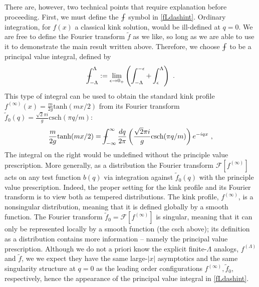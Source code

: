 \def\letter{0}\def\pr{0}\documentclass[a4paper,12pt, epsfig]{article}
\def\Xint#1{\mathchoice
   {\XXint\displaystyle\textstyle{#1}}%
   {\XXint\textstyle\scriptstyle{#1}}%
   {\XXint\scriptstyle\scriptscriptstyle{#1}}%
   {\XXint\scriptscriptstyle\scriptscriptstyle{#1}}%
   \!\int}
\def\XXint#1#2#3{{\setbox0=\hbox{$#1{#2#3}{\int}$}
     \vcenter{\hbox{$#2#3$}}\kern-.5\wd0}}
\def\dashint{\Xint-}
\renewcommand{\tanh}{\textrm{tanh}}
\newcommand{\csch}{\textrm{csch}}
\renewcommand{\(}{\begin{equation}}
\renewcommand{\)}{end{equation} \vspace{-.05in}\linebreak}
\renewcommand{\=}{\hspace{-.03in}=\hspace{-.02in}}
\renewcommand{\(}{\begin{equation}}
\renewcommand{\)}{\end{equation}}
\renewcommand{\(}{\begin{equation}}
\renewcommand{\)}{\end{equation}}
\begin{document}
There are, however, two technical points that require explanation before proceeding.  First, we must define the $\dashint$ symbol in \eqref{fLdashint}.  Ordinary integration, for $f(x)$ a classical kink solution, would be ill-defined at $q=0$.  We are free to define the Fourier transform $\tilde{f}$ as we like, so long as we are able to use it to demonstrate the main result written above.  Therefore, we choose $\dashint$ to be a principal value integral, defined by 
%
\begin{equation}\label{PVint}
\dashint_{-\Lambda}^{\Lambda} := \lim_{\epsilon \to 0_+} \left( \int_{-\Lambda}^{-\epsilon} + \int_{\epsilon}^{\Lambda} \right)~.
\end{equation}
%
This type of integral can be used to obtain the standard kink profile $f^{(\infty)}(x) = \frac{m}{2g} \tanh(mx/2)$ from its Fourier transform $\tilde{f}_0(q) = \frac{\sqrt{2} \pi i}{g} \csch(\pi q/m)$:
%
\begin{equation}\label{tildef0}
\frac{m}{2g} \tanh(mx/2) = \dashint_{-\infty}^{\infty} \frac{dq}{2\pi} \left( \frac{\sqrt{2} \pi i}{g} \csch(\pi q/m) \right) e^{-i q x}~,
\end{equation}
%
The integral on the right would be undefined without the principle value prescription.  More generally, as a distribution the Fourier transform $\mathcal{F}[f^{(\infty)}]$ acts on any test function $b(q)$ via integration against $\tilde{f}_0(q)$ with the principle value prescription.  Indeed, the proper setting for the kink profile and its Fourier transform is to view both as tempered distributions.  The kink profile, $f^{(\infty)}$, is a nonsingular distribution, meaning that it is defined globally by a smooth function.  The Fourier transform $\tilde{f}_0 = \mathcal{F}[f^{(\infty)}]$ is singular, meaning that it can only be represented locally by a smooth function (the csch above); its definition as a distribution contains more information -- namely the principal value prescription.  Although we do not a priori know the explicit finite-$\Lambda$ analogs, $f^{(\Lambda)}$ and $\tilde{f}$, we we expect they have the same large-$|x|$ asymptotics and the same singularity structure at $q = 0$ as the leading order configurations $f^{(\infty)}, \tilde{f}_0$, respectively, hence the appearance of the principal value integral in \eqref{fLdashint}.
\end{document}
